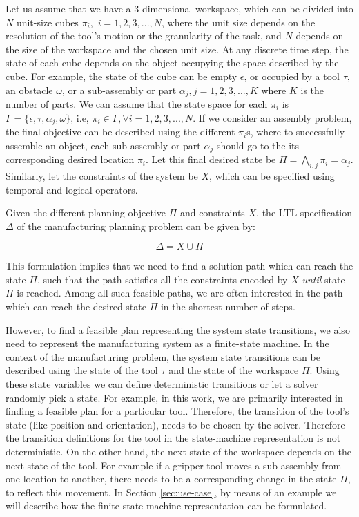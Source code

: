\documentclass[3p,twocolumn,times,procedia]{elsarticle}
\begin{document}
Let us assume that we have a 3-dimensional workspace, which can be divided into $N$ unit-size cubes $\pi_i,$ $i=1,2,3,...,N$, where the unit size depends on the resolution of the tool's motion or the granularity of the task, and $N$ depends on the size of the workspace and the chosen unit size. At any discrete time step, the state of each cube depends on the object occupying the space described by the cube. For example, the state of the cube can be empty $\epsilon$, or occupied by a tool $\tau$, an obstacle $\omega$, or a sub-assembly or part $\alpha_j, j=1,2,3,...,K$ where $K$ is the number of parts. We can assume that the state space for each $\pi_i$ is $ \Gamma = \{\epsilon, \tau, \alpha_j, \omega\}$, i.e, $\pi_i \in \Gamma, \forall i=1,2,3,...,N$. If we consider an assembly problem, the final objective can be described using the different $\pi_i$s, where to successfully assemble an object, each sub-assembly or part $\alpha_j$ should go to the its corresponding desired location $\pi_i$. Let this final desired state be $\Pi = \bigwedge_{i,j} \pi_i = \alpha_j$. Similarly, let the constraints of the system be $X$, which can be specified using temporal and logical operators.

Given the different planning objective $\Pi$ and constraints $X$, the LTL specification $\Delta$ of the manufacturing planning problem can be given by:

\begin{equation}
\Delta = X \cup \Pi
\end{equation}

This formulation implies that we need to find a solution path which can reach the state $\Pi$, such that the path satisfies all the constraints encoded by $X$ \textit{until} state $\Pi$ is reached. Among all such feasible paths, we are often interested in the path which can reach the desired state $\Pi$ in the shortest number of steps. 

However, to find a feasible plan representing the system state transitions, we also need to represent the manufacturing system as a finite-state machine. In the context of the manufacturing problem, the system state transitions can be described using the state of the tool $\tau$ and the state of the workspace $\Pi$. Using these state variables we can define deterministic transitions or let a solver randomly pick a state. For example, in this work, we are primarily interested in finding a feasible plan for a particular tool. Therefore, the transition of the tool's state (like position and orientation), needs to be chosen by the solver. Therefore the transition definitions for the tool in the state-machine representation is not deterministic. On the other hand, the next state of the workspace depends on the next state of the tool. For example if a gripper tool moves a sub-assembly from one location to another, there needs to be a corresponding change in the state $\Pi$, to reflect this movement. In Section \ref{sec:use-case}, by means of an example we will describe how the finite-state machine representation can be formulated.
\end{document}
